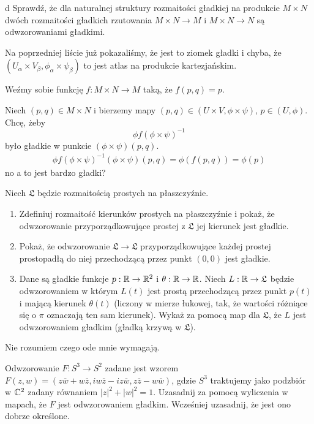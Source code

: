 \documentclass{article}
\begin{document}
\begin{problem}{d}
Sprawdź, że dla naturalnej struktury rozmaitości gładkiej na produkcie $M\times N$ dwóch rozmaitości gładkich rzutowania $M\times N\to M$ i $M\times N\to N$ są odwzorowaniami gładkimi.
\end{problem}

Na poprzedniej liście już pokazaliśmy, że jest to ziomek gładki i chyba, że $(U_\alpha\times V_\beta, \phi_\alpha\times \psi_\beta)$ to jest atlas na produkcie kartezjańskim.

Weźmy sobie funkcję $f:M\times N\to M$ taką, że $f(p,q)=p$.

Niech $(p,q)\in M\times N$ i bierzemy mapy $(p,q)\in (U\times V,\phi\times \psi)$, $p\in(U,\phi)$. Chcę, żeby
$$\phi f(\phi\times\psi)^{-1}$$
było gładkie w punkcie $(\phi\times\psi)(p,q)$.
\begin{align*}
    \phi f(\phi\times\psi)^{-1}(\phi\times\psi)(p,q)=\phi(f(p,q))=\phi(p)
\end{align*}
no a to jest bardzo gładki?

\begin{problem}{}
Niech $\mathfrak{L}$ będzie rozmaitością prostych na płaszczyźnie.
\begin{enumerate}[label=(\alph*)]
    \item Zdefiniuj rozmaitość kierunków prostych na płaszczyźnie i pokaż, że odwzorowanie przyporządkowujące prostej z $\mathfrak{L}$ jej kierunek jest gładkie.
    \item Pokaż, że odwzorowanie $\mathfrak{L}\to\mathfrak{L}$ przyporządkowujące każdej prostej prostopadłą do niej przechodzącą przez punkt $(0,0)$ jest gładkie.
    \item Dane są gładkie funkcje $p:\mathbb{R}\to\mathbb{R}^2$ i $\theta:\mathbb{R}\to\mathbb{R}$. Niech $L:\mathbb{R}\to\mathfrak{L}$ będzie odwzorowaniem w którym $L(t)$ jest prostą przechodzącą przez punkt $p(t)$ i mającą kierunek $\theta(t)$ (liczony w mierze łukowej, tak, że wartości różniące się o $\pi$ oznaczają ten sam kierunek). Wykaż za pomocą map dla $\mathfrak{L}$, że $L$ jest odwzorowaniem gładkim (gładką krzywą w $\mathfrak{L}$).
\end{enumerate}
\end{problem}

Nie rozumiem czego ode mnie wymagają.

\begin{problem}{}
Odwzorowanie $F:S^3\to S^2$ zadane jest wzorem $F(z,w)=(z\overline{w}+w\overline{z},iw\overline{z}-iz\overline{w},z\overline{z}-w\overline{w})$, gdzie $S^3$ traktujemy jako podzbiór w $\mathbb{C}^2$ zadany równaniem $|z|^2+|w|^2=1$. Uzasadnij za pomocą wyliczenia w mapach, że $F$ jest odwzorowaniem gładkim. Wcześniej uzasadnij, że jest ono dobrze określone.
\end{problem}
\end{document}

